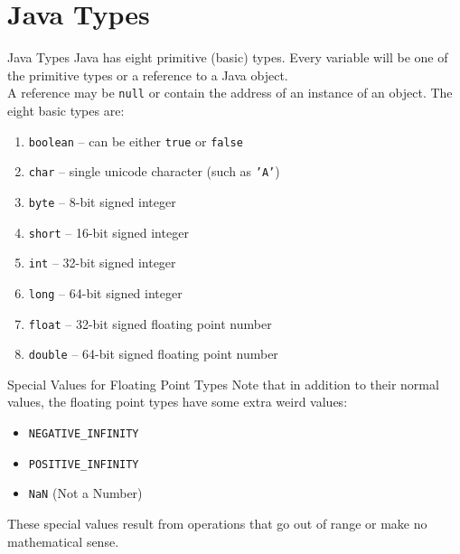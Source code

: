 \documentclass{beamer}
\begin{document}
\section{Java Types}



\begin{frame}{Java Types}
Java has eight primitive (basic) types. Every variable will be one of the primitive types or a reference to a Java object. \\
\vspace{0.5em}
A reference may be \texttt{null} or contain the address of an instance of an object. The eight basic types are:

\begin{enumerate}
\item \texttt{boolean} -- can be either \texttt{true} or \texttt{false}
\item \texttt{char} -- single unicode character (such as \texttt{'A'})
\item \texttt{byte} -- 8-bit signed integer
\item \texttt{short} -- 16-bit signed integer
\item \texttt{int} -- 32-bit signed integer
\item \texttt{long} -- 64-bit signed integer
\item \texttt{float} -- 32-bit signed floating point number
\item \texttt{double} -- 64-bit signed floating point number
\end{enumerate}
\end{frame}



\begin{frame}{Special Values for Floating Point Types}
Note that in addition to their normal values, the floating point types have some extra weird values: \\
\vspace{1em}
\begin{itemize}
\item \texttt{NEGATIVE\_INFINITY}
\item \texttt{POSITIVE\_INFINITY} 
\item \texttt{NaN} (Not a Number)
\end{itemize}
\vspace{1em}
These special values result from operations that go out of range or make no mathematical sense. \\
\end{frame}
\end{document}
